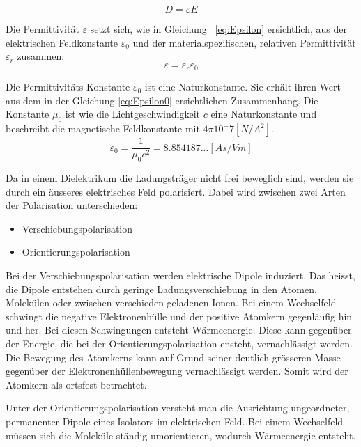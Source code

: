 \begin{equation}\label{eq:FlussdichteD}
D=\varepsilon E
\end{equation}

Die Permittivität $\varepsilon$ setzt sich, wie in Gleichung \ \ref{eq:Epsilon} ersichtlich, aus der elektrischen Feldkonstante $\varepsilon_0$ und der materialspezifischen, relativen Permittivität $\varepsilon_r$ zusammen:
\begin{equation}\label{eq:Epsilon}
\varepsilon = \varepsilon_r \varepsilon_0
\end{equation}

Die Permittivitäts Konstante $\varepsilon_{0}$ ist eine Naturkonstante. Sie erhält ihren Wert aus dem in der Gleichung \ref{eq:Epsilon0} ersichtlichen Zusammenhang. Die Konstante $\mu_{0}  $ ist wie die Lichtgeschwindigkeit $c$ eine Naturkonstante und beschreibt die magnetische Feldkonstante mit $4\pi10^-7 [N/A^{2}]$.
\begin{equation}\label{eq:Epsilon0}
\varepsilon_{0} = \dfrac{1}{\mu_{0}c^{2}}=8.854187...[As/Vm]
\end{equation}



Da in einem Dielektrikum die Ladungsträger nicht frei beweglich sind, werden sie durch ein äusseres elektrisches Feld polarisiert. Dabei wird zwischen zwei Arten der Polarisation unterschieden:
\begin{itemize}
\item Verschiebungspolarisation
\item Orientierungspolarisation
\end{itemize}

Bei der Verschiebungspolarisation werden elektrische Dipole  induziert. Das heisst,  die Dipole entstehen durch geringe Ladungsverschiebung in den Atomen, Molekülen oder zwischen verschieden geladenen Ionen. Bei einem Wechselfeld schwingt die negative Elektronenhülle und der positive Atomkern gegenläufig hin und her.  Bei diesen Schwingungen entsteht  Wärmeenergie.  Diese kann gegenüber der Energie, die bei der Orientierungspolarisation ensteht,  vernachlässigt werden.  Die Bewegung des Atomkerns kann auf Grund seiner deutlich grösseren Masse  gegenüber der Elektronenhüllenbewegung vernachlässigt werden. Somit wird der Atomkern als ortsfest betrachtet. 

Unter der Orientierungspolarisation versteht man die Ausrichtung ungeordneter, permanenter Dipole eines Isolators im elektrischen Feld. Bei einem Wechselfeld müssen sich die Moleküle ständig umorientieren, wodurch Wärmeenergie entsteht.

